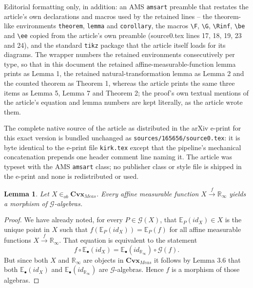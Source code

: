 \documentclass[10pt,a4paper]{amsart}
\newtheorem{lemma}{Lemma}
\newcommand{\G}{\mathcal{G}}
\begin{document}
Editorial formatting only, in addition: an AMS \texttt{amsart} preamble that restates the article's own declarations and macros used by the retained lines -- the theorem-like environments \texttt{theorem}, \texttt{lemma} and \texttt{corollary}, the macros \texttt{\textbackslash F}, \texttt{\textbackslash G}, \texttt{\textbackslash Rinf}, \texttt{\textbackslash be} and \texttt{\textbackslash ee} copied from the article's own preamble (source0.tex lines 17, 18, 19, 23 and 24), and the standard \texttt{tikz} package that the article itself loads for its diagrams. The wrapper numbers the retained environments consecutively per type, so that in this document the retained affine-measurable-function lemma prints as Lemma 1, the retained natural-transformation lemma as Lemma 2 and the counted theorem as Theorem 1, whereas the article prints the same three items as Lemma 5, Lemma 7 and Theorem 2; the proof's own textual mentions of the article's equation and lemma numbers are kept literally, as the article wrote them.

The complete native source of the article as distributed in the arXiv e-print for this exact version is bundled unchanged as \texttt{sources/165656/source0.tex}: it is byte identical to the e-print file \texttt{kirk.tex} except that the pipeline's mechanical concatenation prepends one header comment line naming it. The article was typeset with the AMS \texttt{amsart} class; no publisher class or style file is shipped in the e-print and none is redistributed or used.
\begin{lemma} \label{Lemma5} Let $X \in_{ob} \mathbf{Cvx}_{Meas}$. Every affine measurable function $X \xrightarrow{f} \mathbb{R}_{\infty}$ yields a morphism of $\G$-algebras.
\end{lemma}
\begin{proof} 
We have already noted, for every $P \in \G(X)$, that   $\mathbb{E}_P(id_X) \in X$ is the unique point in $X$ such that $f(\mathbb{E}_{P}(id_X)) = \mathbb{E}_P(f)$ for all affine measurable functions $X \xrightarrow{f} \mathbb{R}_{\infty}$.
That equation is equivalent to the statement 
$$
f \circ \mathbb{E}_{\bullet}(id_X) = \mathbb{E}_{\bullet}(id_{\mathbb{R}_{\infty}}) \circ \G(f).
$$
But since both $X$ and $\mathbb{R}_{\infty}$ are objects in $\mathbf{Cvx}_{Meas}$ it follows by  Lemma 3.6 that both $\mathbb{E}_{\bullet}(id_X)$ and $\mathbb{E}_{\bullet}(id_{\mathbb{R}_{\infty}})$ are $\G$-algebras. Hence $f$ is a morphism of those algebras.
\end{proof}
\end{document}
